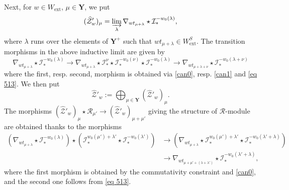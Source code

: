 \documentclass[11pt]{amsart}
\theoremstyle{plain}
\theoremstyle{remark}
\numberwithin{equation}{section}
\begin{document}
	Next, for $w\in W_{\mathrm{ext}}$, $\mu\in\mathbf{Y}$, we put
	$$(\widehat{\mathcal{Z}}'_w)_\mu=\varinjlim_{\lambda} \nabla_{wt_{\mu+\lambda}}\star \mathcal{I}^{-w_0(\lambda)}_*,$$
	where $\lambda$ runs over the elements of $\mathbf{Y}^+$ such that $wt_{\mu+\lambda}\in W^S_\mathrm{ext}$. The transition morphisms in the above inductive limit are given by
	$$ \nabla_{wt_{\mu+\lambda}}\star \mathcal{I}^{-w_0(\lambda)}_*\to \nabla_{wt_{\mu+\lambda}}\star\mathcal{I}^{\nu}_*\star\mathcal{I}^{-w_0(\nu)}_*\star \mathcal{I}^{-w_0(\lambda)}_*\to \nabla_{wt_{\mu+\lambda+\nu}}\star \mathcal{I}^{-w_0(\lambda+\nu)}_* $$
	where the first, resp. second, morphism is obtained via \eqref{can0}, resp. \eqref{can1} and \eqref{eq 513}. We then put 
	$$\widehat{\mathcal{Z}}'_w:=\bigoplus_{\mu\in\mathbf{Y}}(\widehat{\mathcal{Z}}'_w)_\mu. $$
	The morphisms $(\widehat{\mathcal{Z}}'_w)_\mu\star \mathcal{R}_{\mu'}\to (\widehat{\mathcal{Z}}'_w)_{\mu+\mu'}$ giving the structure of $\mathcal{R}$-module are obtained thanks to the morphisms
	\begin{align*}
		(\nabla_{wt_{\mu+\lambda}}\star \mathcal{I}^{-w_0(\lambda)}_*) \star(\mathcal{I}^{w_0(\mu')+\lambda'}_*\star\mathcal{I}^{-w_0(\lambda')}_*)&\to (\nabla_{wt_{\mu+\lambda}}\star \mathcal{I}^{w_0(\mu')+\lambda'}_*\star\mathcal{I}^{-w_0(\lambda'+\lambda)}_*)\\
		& \to\nabla_{wt_{\mu+\mu'+(\lambda+\lambda')}}\star\mathcal{I}^{-w_0(\lambda'+\lambda)}_*,
	\end{align*}
	where the first morphism is obtained by the commutativity constraint and \eqref{can0}, and the second one follows from \eqref{eq 513}.
	
\end{document}
